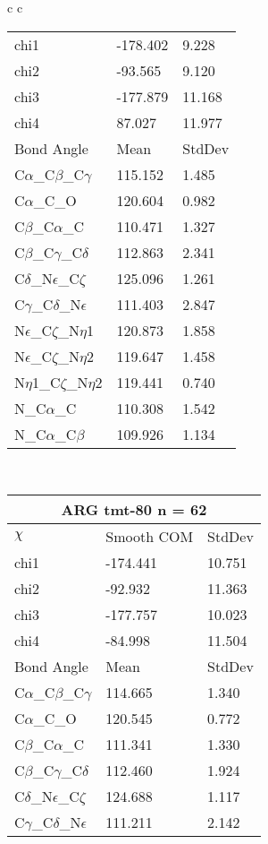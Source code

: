 \begin{longtable}{ c c }
\begin{tabular}{ l l l }
  chi1 & -178.402 & 9.228 \\ 
  chi2 & -93.565 & 9.120 \\ 
  chi3 & -177.879 & 11.168 \\ 
  chi4 & 87.027 & 11.977 \\ \midrule
  Bond Angle   & Mean     & StdDev \\ \midrule
  C$\alpha$\_C$\beta$\_C$\gamma$ & 115.152 & 1.485\\
  C$\alpha$\_C\_O & 120.604 & 0.982\\
  C$\beta$\_C$\alpha$\_C & 110.471 & 1.327\\
  C$\beta$\_C$\gamma$\_C$\delta$ & 112.863 & 2.341\\
  C$\delta$\_N$\epsilon$\_C$\zeta$ & 125.096 & 1.261\\
  C$\gamma$\_C$\delta$\_N$\epsilon$ & 111.403 & 2.847\\
  N$\epsilon$\_C$\zeta$\_N$\eta$1 & 120.873 & 1.858\\
  N$\epsilon$\_C$\zeta$\_N$\eta$2 & 119.647 & 1.458\\
  N$\eta$1\_C$\zeta$\_N$\eta$2 & 119.441 & 0.740\\
  N\_C$\alpha$\_C & 110.308 & 1.542\\
  N\_C$\alpha$\_C$\beta$ & 109.926 & 1.134\\
  \bottomrule
  \end{tabular}
  \\
  \begin{tabular}{ l l l }
  \toprule
  \multicolumn{3}{c}{ARG \textbf{tmt-80} n = 62} \\ \toprule
  $\chi$       & Smooth COM & StdDev \\ \midrule
  chi1 & -174.441 & 10.751 \\ 
  chi2 & -92.932 & 11.363 \\ 
  chi3 & -177.757 & 10.023 \\ 
  chi4 & -84.998 & 11.504 \\ \midrule
  Bond Angle   & Mean     & StdDev \\ \midrule
  C$\alpha$\_C$\beta$\_C$\gamma$ & 114.665 & 1.340\\
  C$\alpha$\_C\_O & 120.545 & 0.772\\
  C$\beta$\_C$\alpha$\_C & 111.341 & 1.330\\
  C$\beta$\_C$\gamma$\_C$\delta$ & 112.460 & 1.924\\
  C$\delta$\_N$\epsilon$\_C$\zeta$ & 124.688 & 1.117\\
  C$\gamma$\_C$\delta$\_N$\epsilon$ & 111.211 & 2.142\\

\end{tabular}
\end{longtable}
